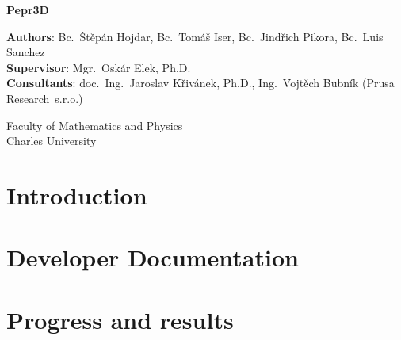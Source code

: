 \documentclass[12pt,a4paper]{report}
\begin{document}
\begin{titlepage}
    \begin{center}
        \vspace*{1cm}

        \Huge
        \textbf{Pepr3D}

        \LARGE

        \vspace{12cm}

		\Large
        \textbf{Authors}:
        Bc.~Štěpán Hojdar,
        Bc.~Tomáš Iser,
        Bc.~Jindřich Pikora,
		Bc.~Luis Sanchez
		\\
		\textbf{Supervisor}: Mgr.~Oskár Elek, Ph.D.
		\\
		\textbf{Consultants}: doc.~Ing.~Jaroslav Křivánek, Ph.D., Ing.~Vojtěch Bubník (Prusa Research~s.r.o.)

        \vfill

		Faculty of Mathematics and Physics \\
		Charles University
    \end{center}
\end{titlepage}

\setcounter{tocdepth}{1}
\tableofcontents

\part{Introduction}




\part{Developer Documentation}












\part{Progress and results}
\end{document}

